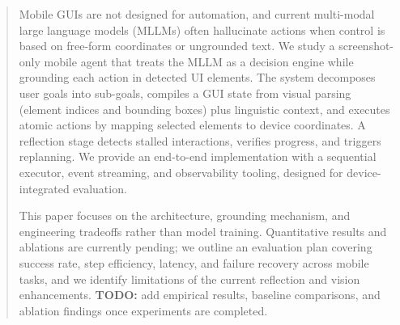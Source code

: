 \begin{abstract}
Mobile GUIs are not designed for automation, and current multi-modal large language models (MLLMs) often hallucinate actions when control is based on free-form coordinates or ungrounded text. We study a screenshot-only mobile agent that treats the MLLM as a decision engine while grounding each action in detected UI elements. The system decomposes user goals into sub-goals, compiles a GUI state from visual parsing (element indices and bounding boxes) plus linguistic context, and executes atomic actions by mapping selected elements to device coordinates. A reflection stage detects stalled interactions, verifies progress, and triggers replanning. We provide an end-to-end implementation with a sequential executor, event streaming, and observability tooling, designed for device-integrated evaluation. 

This paper focuses on the architecture, grounding mechanism, and engineering tradeoffs rather than model training. Quantitative results and ablations are currently pending; we outline an evaluation plan covering success rate, step efficiency, latency, and failure recovery across mobile tasks, and we identify limitations of the current reflection and vision enhancements. \textbf{TODO:} add empirical results, baseline comparisons, and ablation findings once experiments are completed.
\end{abstract}
